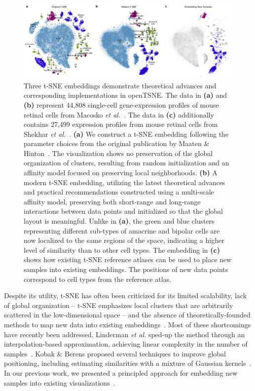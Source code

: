 \documentclass[twocolumn]{article}
\newcommand{\opentsne}{\textsf{openTSNE}}
\begin{document}
\begin{figure}[htbp]
  \includegraphics[width=\textwidth]{macosko2015}
\caption{\label{fig:macosko}
Three t-SNE embeddings demonstrate theoretical advances and corresponding implementations in
\opentsne. The data in \textbf{(a)} and \textbf{(b)} represent 44,808
single-cell gene-expression profiles of mouse retinal cells from Macosko
\textit{et al.}~\cite{macosko2015highly}. The data in \textbf{(c)}
additionally contains 27,499 expression profiles from mouse
retinal cells from Shekhar \textit{et
al.}~\cite{shekhar2016comprehensive}. \textbf{(a)} We construct a t-SNE
embedding following the parameter choices from the original publication
by Maaten \& Hinton~\cite{maaten2008visualizing}. The visualization
shows no preservation of the global organization of clusters,
resulting from random initialization and an affinity model focused on
preserving local neighborhoods. \textbf{(b)} A modern t-SNE
embedding, utilizing the latest theoretical advances and practical
recommendations constructed using a multi-scale
affinity model, preserving both short-range and long-range interactions
between data points and initialized so that the global layout is
meaningful. Unlike in \textbf{(a)}, the green and blue clusters
representing different sub-types of amacrine and bipolar cells are now
localized to the same regions of the space, indicating a higher level
of similarity than to other cell types. The embedding in \textbf{(c)} shows how existing
t-SNE reference atlases can be used to place new samples into existing
embeddings. The positions of new data points correspond to cell types
from the reference atlas.
}
\end{figure}

Despite its utility, t-SNE has often been criticized for its limited
scalability, lack of global organization -- t-SNE emphasizes local clusters that
are arbitrarily scattered in the low-dimensional space -- and the absence of
theoretically-founded methods to map new data into existing
embeddings~\cite{ding2018interpretable,becht2019dimensionality}. Most of these
shortcomings have recently been addressed. Linderman \textit{et al.} sped-up the
method through an interpolation-based approximation, achieving linear complexity
in the number of samples~\cite{linderman2019fast}. Kobak \& Berens proposed
several techniques to improve global positioning, including estimating
similarities with a mixture of Gaussian kernels~\cite{kobak2019art}. In our
previous work, we presented a principled approach for embedding new samples into
existing visualizations~\cite{policar2019embedding}.
\end{document}
